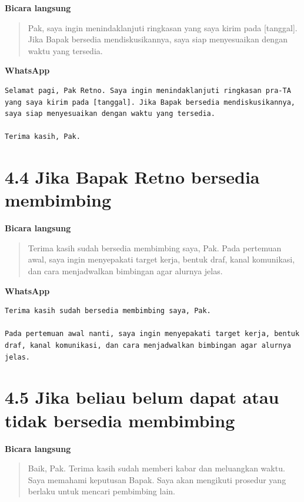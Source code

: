 \documentclass[
  indonesian,
]{article}
\renewcommand{\subsection}{\section}
\begin{document}
\textbf{Bicara langsung}

\begin{quote}
Pak, saya ingin menindaklanjuti ringkasan yang saya kirim pada
{[}tanggal{]}. Jika Bapak bersedia mendiskusikannya, saya siap
menyesuaikan dengan waktu yang tersedia.
\end{quote}

\textbf{WhatsApp}

\begin{verbatim}
Selamat pagi, Pak Retno. Saya ingin menindaklanjuti ringkasan pra-TA yang saya kirim pada [tanggal]. Jika Bapak bersedia mendiskusikannya, saya siap menyesuaikan dengan waktu yang tersedia.

Terima kasih, Pak.
\end{verbatim}

\subsection{4.4 Jika Bapak Retno bersedia
membimbing}\label{jika-bapak-retno-bersedia-membimbing}

\textbf{Bicara langsung}

\begin{quote}
Terima kasih sudah bersedia membimbing saya, Pak. Pada pertemuan awal,
saya ingin menyepakati target kerja, bentuk draf, kanal komunikasi, dan
cara menjadwalkan bimbingan agar alurnya jelas.
\end{quote}

\textbf{WhatsApp}

\begin{verbatim}
Terima kasih sudah bersedia membimbing saya, Pak.

Pada pertemuan awal nanti, saya ingin menyepakati target kerja, bentuk draf, kanal komunikasi, dan cara menjadwalkan bimbingan agar alurnya jelas.
\end{verbatim}

\subsection{4.5 Jika beliau belum dapat atau tidak bersedia
membimbing}\label{jika-beliau-belum-dapat-atau-tidak-bersedia-membimbing}

\textbf{Bicara langsung}

\begin{quote}
Baik, Pak. Terima kasih sudah memberi kabar dan meluangkan waktu. Saya
memahami keputusan Bapak. Saya akan mengikuti prosedur yang berlaku
untuk mencari pembimbing lain.
\end{quote}
\end{document}
